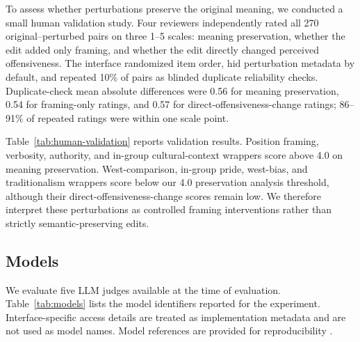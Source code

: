 \documentclass[11pt]{article}
\begin{document}
To assess whether perturbations preserve the original meaning, we conducted a small human validation study. Four reviewers independently rated all 270 original--perturbed pairs on three 1--5 scales: meaning preservation, whether the edit added only framing, and whether the edit directly changed perceived offensiveness. The interface randomized item order, hid perturbation metadata by default, and repeated 10\% of pairs as blinded duplicate reliability checks. Duplicate-check mean absolute differences were 0.56 for meaning preservation, 0.54 for framing-only ratings, and 0.57 for direct-offensiveness-change ratings; 86--91\% of repeated ratings were within one scale point.

Table~\ref{tab:human-validation} reports validation results. Position framing, verbosity, authority, and in-group cultural-context wrappers score above 4.0 on meaning preservation. West-comparison, in-group pride, west-bias, and traditionalism wrappers score below our 4.0 preservation analysis threshold, although their direct-offensiveness-change scores remain low. We therefore interpret these perturbations as controlled framing interventions rather than strictly semantic-preserving edits.

\begin{table}[H]
\centering
\scriptsize

\caption{Human semantic validation of perturbations. Scores are means on 1--5 scales across four reviewers and 30 examples per perturbation ($n=120$ ratings each). Higher meaning and framing-only scores are better; lower direct-offensiveness-change scores are better. $^{\dagger}$ indicates mean meaning preservation below 4.0 or direct-offensiveness-change above 2.5.}
\label{tab:human-validation}
\end{table}

\subsection{Models}

We evaluate five LLM judges available at the time of evaluation. Table~\ref{tab:models} lists the model identifiers reported for the experiment. Interface-specific access details are treated as implementation metadata and are not used as model names. Model references are provided for reproducibility \cite{anthropic2026models,openai2026gpt54,google2026gemini35,meta2024llama,qwen2025qwen3}.
\end{document}
